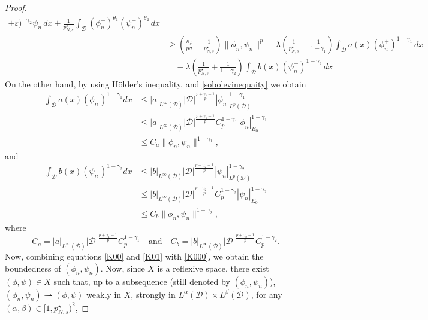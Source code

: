 \documentclass[reqno]{amsart}
\begin{document}
\begin{proof}
\begin{equation}
\begin{aligned}
 +\varepsilon)^{-\gamma_2}\psi_n\,dx+\frac{1}{p^\star_{N,s}}\int_\mathcal{D}
 (\phi_n^+)^{\theta_1}(\psi_n^+)^{\theta_2}\,dx \\
&\geq(\frac{\kappa_\delta}{p\sigma}-\frac{1}{p^\star_{N,s}})\| \phi_n,\psi_n\|^p
 -\lambda(\frac{1}{p^\star_{N,s}}+\frac{1}{1-\gamma_1})
  \int_\mathcal{D} a(x)(\phi_n^+)^{1-\gamma_1}\,dx\\
&\quad -\lambda(\frac{1}{p^\star_{N,s}}+\frac{1}{1-\gamma_2})
 \int_\mathcal{D} b(x)(\psi_n^+)^{1-\gamma_2}\,dx
\end{aligned}
\end{equation}
On the other hand, by using  H\"older's inequality, and \eqref{sobolevinequaity}
  we obtain
\begin{equation} \label{K00}
\begin{aligned}
\int_\mathcal{D} a(x)(\phi_n^+)^{1-\gamma_1} dx
&\leq |a|_{L^\infty(\mathcal{D})}|\mathcal{D}|^\frac{p+\gamma_1-1}{p}
 |\phi_n|_{L^p(\mathcal{D})}^{1-\gamma_1} \\
&\leq |a|_{L^\infty(\mathcal{D})}|\mathcal{D}|^\frac{p+\gamma_1-1}{p}
 C_p^{1-\gamma_1}|\phi_n|_{E_0}^{1-\gamma_1}\\
&\leq C_a \| \phi_n,\psi_n\|^{1-\gamma_1},
\end{aligned}
\end{equation}
and
\begin{equation}  \label{K01}
\begin{aligned}
\int_\mathcal{D} b(x)(\psi_n^+)^{1-\gamma_2} dx
&\leq |b|_{L^\infty(\mathcal{D})}|\mathcal{D}|^\frac{p+\gamma_2-1}{p}
 |\psi_n|_{L^p(\mathcal{D})}^{1-\gamma_2} \\
&\leq |b|_{L^\infty(\mathcal{D})}|\mathcal{D}|^\frac{p+\gamma_2-1}{p}
 C_p^{1-\gamma_2}|\psi_n|_{E_0}^{1-\gamma_2}\\
&\leq C_b \| \phi_n,\psi_n\|^{1-\gamma_2},
\end{aligned}
\end{equation}
where
$$
C_a=|a|_{L^\infty(\mathcal{D})}|\mathcal{D}|^\frac{p+\gamma_1-1}{p}C_p^{1-\gamma_1}\quad
\text{and}\quad
C_b=|b|_{L^\infty(\mathcal{D})}|\mathcal{D}|^\frac{p+\gamma_2-1}{p}C_p^{1-\gamma_2}.
$$
Now, combining equations \eqref{K00} and \eqref{K01} with \eqref{K000}, we obtain
the boundedness of $(\phi_n,\psi_n)$. Now, since $X$ is a reflexive space, there exist
$(\phi,\psi)\in X$ such that, up to a subsequence (still denoted by $(\phi_n,\psi_n)$),
$(\phi_n,\psi_n)\rightharpoonup (\phi,\psi)$ weakly in $X$, strongly in
$ L^\alpha(\mathcal{D})\times L^\beta(\mathcal{D})$, for any $(\alpha,\beta)\in [1,p^\star_{N,s})^2$,

\end{proof}
\end{document}
